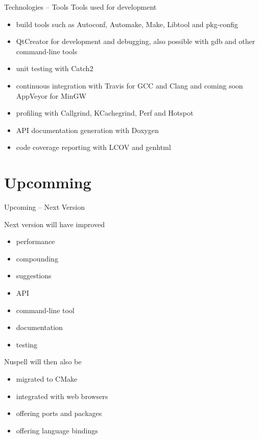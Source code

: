 \documentclass{beamer}
\begin{document}
\begin{frame}{Technologies – Tools}
Tools used for development
\begin{itemize}
\item build tools such as Autoconf, Automake, Make, Libtool and pkg-config
\item QtCreator for development and debugging, also possible with gdb and other command-line tools
\item unit testing with Catch2
\item continuous integration with Travis for GCC and Clang and coming soon AppVeyor for MinGW
\item profiling with Callgrind, KCachegrind, Perf and Hotspot
\item API documentation generation with Doxygen
\item code coverage reporting with LCOV and genhtml
\end{itemize}
\end{frame}



\section{Upcomming}

\begin{frame}{Upcoming – Next Version}
\begin{multicols}{2}
Next version will have improved
\begin{itemize}
\item \alert{performance}
\item compounding
\item suggestions
\item API
\item command-line tool
\item documentation
\item testing
\end{itemize}
Nuspell will then also be
\begin{itemize}
\item migrated to CMake
\item integrated with web browsers
\item offering ports and packages
\item offering language bindings
\end{itemize}
\end{multicols}
\end{frame}
\end{document}
